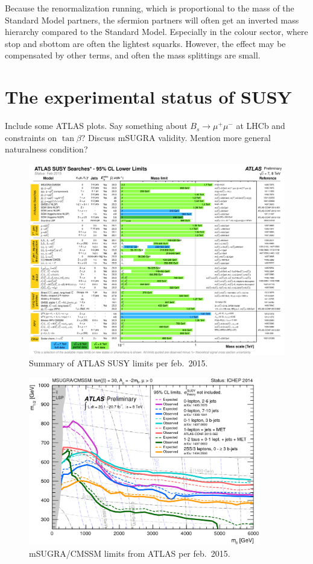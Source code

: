 Because the renormalization running, which is proportional to the mass of the Standard Model partners, the sfermion partners will often get an inverted mass hierarchy compared to the Standard Model. Especially in the colour sector, where stop and sbottom are often the lightest squarks. However, the effect may be compensated by other terms, and often the mass splittings are small.



\section{The experimental status of SUSY}
Include some ATLAS plots. Say something about $B_s \to \mu^+ \mu^-$ at LHCb and constraints on $\tan \beta$? Discuss mSUGRA validity. Mention more general naturalness condition?

\begin{figure}[hbt]
	\centering
	\includegraphics[width=1\textwidth]{figures/susyintro/ATLAS_SUSY_Summary.png}
	\caption{Summary of ATLAS SUSY limits per feb.\ 2015. }
	\label{fig:higgspot}
\end{figure}

\begin{figure}[hbt]
	\centering
	\includegraphics[width=0.9\textwidth]{figures/susyintro/ATLAS_SUSY_MSUGRA.png}
	\caption{mSUGRA/CMSSM limits from ATLAS per feb.\ 2015. }
	\label{fig:higgspot}
\end{figure}
